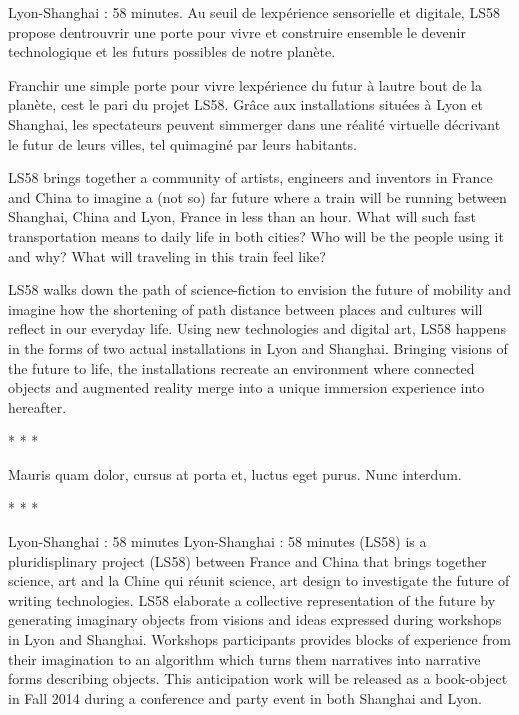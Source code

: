 Lyon-Shanghai : 58 minutes. Au seuil de l{\textquotesingle}exp\'erience
sensorielle et digitale, LS58 propose d{\textquotesingle}entrouvrir une
porte pour vivre et construire ensemble le devenir technologique et les
futurs possibles de notre plan\`ete.

Franchir une simple porte pour vivre l{\textquotesingle}exp\'erience du
futur \`a l{\textquotesingle}autre bout de la plan\`ete,
c{\textquotesingle}est le pari du projet LS58. Gr\^ace aux
installations situ\'ees \`a Lyon et Shanghai, les spectateurs peuvent
s{\textquotesingle}immerger dans une r\'ealit\'e virtuelle d\'ecrivant
le futur de leurs villes, tel qu{\textquotesingle}imagin\'e par leurs
habitants.

LS58 brings together a community of artists, engineers and inventors in
France and China to\newline
imagine a (not so) far future where a train will be running between
Shanghai, China and Lyon,\newline
France in less than an hour. What will such fast transportation means to
daily life in both cities?\newline
Who will be the people using it and why? What will traveling in this
train feel like?

LS58 walks down the path of science-fiction to envision the future of
mobility and imagine how the shortening of path distance between places
and cultures will reflect in our everyday life.\newline
Using new technologies and digital art, LS58 happens in the forms of two
actual installations in\newline
Lyon and Shanghai. Bringing visions of the future to life, the
installations recreate an\newline
environment where connected objects and augmented reality merge into a
unique immersion\newline
experience into hereafter.

{\centering
* * *
\par}

{\centering
Mauris quam dolor, cursus at porta et, luctus eget purus. Nunc interdum.
\par}

{\centering
* * *
\par}

Lyon-Shanghai : 58 minutes Lyon-Shanghai : 58 minutes (LS58) is a
pluridisplinary project (LS58) between France and China that brings
together science, art and la Chine qui r\'eunit science, art design to
investigate the future of writing technologies.\newline
LS58 elaborate a collective representation of the future by generating
imaginary objects from visions and ideas expressed during workshops in
Lyon and Shanghai. Workshops participants provides blocks of experience
from their imagination to an algorithm which turns them narratives into
narrative forms describing objects. This anticipation work will be
released as a book-object in Fall 2014 during a conference and party
event in both Shanghai and Lyon.

